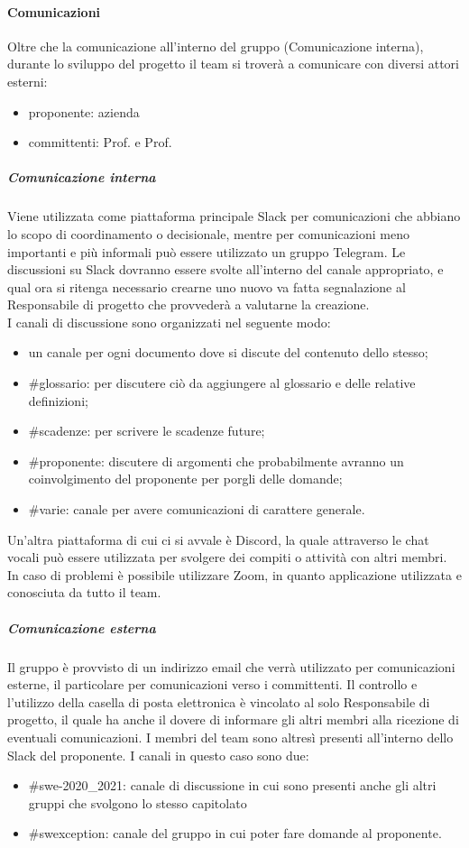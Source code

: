 \paragraph{Comunicazioni}
Oltre che la comunicazione all'interno del gruppo (Comunicazione interna), durante lo sviluppo del progetto il team si troverà a comunicare con diversi attori esterni:
\begin{itemize}
    \item proponente: azienda
    \item committenti: Prof. e Prof.
\end{itemize}
\subparagraph{Comunicazione interna}
Viene utilizzata come piattaforma principale Slack per comunicazioni che abbiano lo scopo di coordinamento o decisionale, mentre per comunicazioni meno importanti e più informali può essere utilizzato un gruppo Telegram.
Le discussioni su Slack dovranno essere svolte all'interno del canale appropriato, e qual ora si ritenga necessario crearne uno nuovo va fatta segnalazione al Responsabile di progetto che provvederà a valutarne la creazione.\\
I canali di discussione sono organizzati nel seguente modo:
\begin{itemize}
\item un canale per ogni documento dove si discute del contenuto dello stesso;
\item {\#glossario:} per discutere ciò da aggiungere al glossario e delle relative definizioni;
\item {\#scadenze:} per scrivere le scadenze future;
\item {\#proponente:} discutere di argomenti che probabilmente avranno un coinvolgimento del proponente per porgli delle domande;
\item {\#varie:} canale per avere comunicazioni di carattere generale.
\end{itemize}
Un'altra piattaforma di cui ci si avvale è Discord, la quale attraverso le chat vocali può essere utilizzata per svolgere dei compiti o attività con altri membri. In caso di problemi è possibile utilizzare Zoom, in quanto applicazione utilizzata e conosciuta da tutto il team.
\subparagraph{Comunicazione esterna}
Il gruppo è provvisto di un indirizzo email che verrà utilizzato per comunicazioni esterne, il particolare per comunicazioni verso i committenti. Il controllo e l'utilizzo della casella di posta elettronica è vincolato al solo Responsabile di progetto, il quale ha anche il dovere di informare gli altri membri alla ricezione di eventuali comunicazioni.
I membri del team sono altresì presenti all'interno dello Slack del proponente. I canali in questo caso sono due:
\begin{itemize}
	\item {\#swe-2020\_2021:} canale di discussione in cui sono presenti anche gli altri gruppi che svolgono lo stesso capitolato
	\item {\#swexception:} canale del gruppo in cui poter fare domande al proponente.
\end{itemize}
